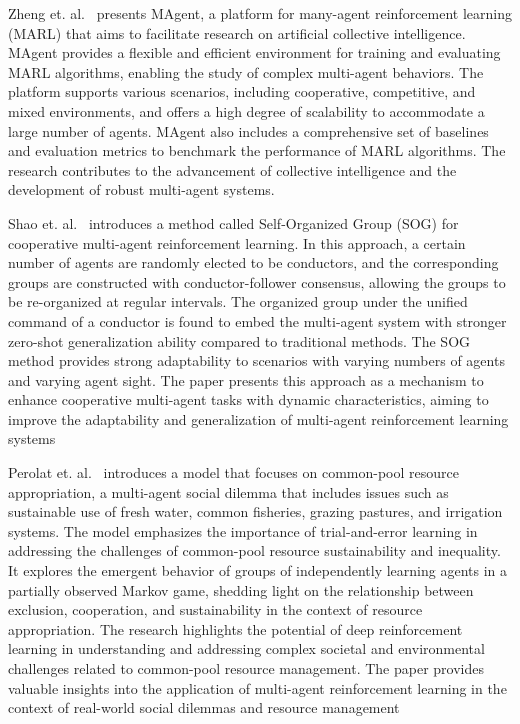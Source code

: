 \documentclass[runningheads]{llncs}
\newcounter{relation}
\begin{document}
Zheng et. al.~\cite{Zheng2018} presents MAgent, a platform for many-agent reinforcement learning (MARL) that aims to facilitate research on artificial collective intelligence. MAgent provides a flexible and efficient environment for training and evaluating MARL algorithms, enabling the study of complex multi-agent behaviors. The platform supports various scenarios, including cooperative, competitive, and mixed environments, and offers a high degree of scalability to accommodate a large number of agents. MAgent also includes a comprehensive set of baselines and evaluation metrics to benchmark the performance of MARL algorithms. The research contributes to the advancement of collective intelligence and the development of robust multi-agent systems.

Shao et. al.~\cite{Shao2022} introduces a method called Self-Organized Group (SOG) for cooperative multi-agent reinforcement learning. In this approach, a certain number of agents are randomly elected to be conductors, and the corresponding groups are constructed with conductor-follower consensus, allowing the groups to be re-organized at regular intervals. The organized group under the unified command of a conductor is found to embed the multi-agent system with stronger zero-shot generalization ability compared to traditional methods. The SOG method provides strong adaptability to scenarios with varying numbers of agents and varying agent sight. The paper presents this approach as a mechanism to enhance cooperative multi-agent tasks with dynamic characteristics, aiming to improve the adaptability and generalization of multi-agent reinforcement learning systems

Perolat et. al.~\cite{Perolat2017} introduces a model that focuses on common-pool resource appropriation, a multi-agent social dilemma that includes issues such as sustainable use of fresh water, common fisheries, grazing pastures, and irrigation systems. The model emphasizes the importance of trial-and-error learning in addressing the challenges of common-pool resource sustainability and inequality. It explores the emergent behavior of groups of independently learning agents in a partially observed Markov game, shedding light on the relationship between exclusion, cooperation, and sustainability in the context of resource appropriation. The research highlights the potential of deep reinforcement learning in understanding and addressing complex societal and environmental challenges related to common-pool resource management. The paper provides valuable insights into the application of multi-agent reinforcement learning in the context of real-world social dilemmas and resource management
\end{document}
